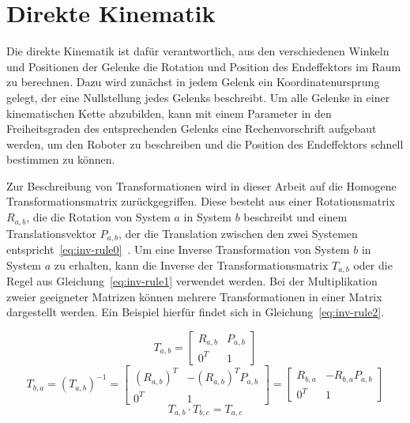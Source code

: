 \cleardoublepage


\chapter{Direkte Kinematik}\label{ch:direkte-kinematik}

Die direkte Kinematik ist dafür verantwortlich, aus den verschiedenen Winkeln und Positionen der Gelenke die Rotation und Position des Endeffektors im Raum zu berechnen.
Dazu wird zunächst in jedem Gelenk ein Koordinatenursprung gelegt, der eine Nullstellung jedes Gelenks beschreibt.
Um alle Gelenke in einer kinematischen Kette abzubilden, kann mit einem Parameter in den Freiheitsgraden des entsprechenden Gelenks eine Rechenvorschrift aufgebaut werden, um den Roboter zu beschreiben und die Position des Endeffektors schnell bestimmen zu können.

Zur Beschreibung von Transformationen wird in dieser Arbeit auf die Homogene Transformationsmatrix zurückgegriffen.
Diese besteht aus einer Rotationsmatrix $R_{a,b}$, die die Rotation von System $a$ in System $b$ beschreibt und einem Translationsvektor $P_{a,b}$, der die Translation zwischen den zwei Systemen entspricht~\ref{eq:inv-rule0}~\cite[28]{craigIntroductionRoboticsMechanics2009}.
Um eine Inverse Transformation von System $b$ in System $a$ zu erhalten, kann die Inverse der Transformationsmatrix $T_{a,b}$ oder die Regel aus Gleichung~\ref{eq:inv-rule1} verwendet werden.
Bei der Multiplikation zweier geeigneter Matrizen können mehrere Transformationen in einer Matrix dargestellt werden.
Ein Beispiel hierfür findet sich in Gleichung~\ref{eq:inv-rule2}.

\begin{equation}
    T_{a,b} = \begin{bmatrix}
                  R_{a,b} & P_{a,b} \\
                  0^T     & 1
    \end{bmatrix} \label{eq:inv-rule0}
\end{equation}
\begin{equation}
    T_{b,a} = \left( T_{a,b} \right)^{-1} =
    \begin{bmatrix}
        \left(R_{a,b}\right)^T & - \left(R_{a,b}\right)^T P_{a,b} \\
        0^T     & 1
    \end{bmatrix} =
    \begin{bmatrix}
        R_{b,a} & - R_{b,a}P_{a,b} \\
        0^T     & 1
    \end{bmatrix}
    \label{eq:inv-rule1}
\end{equation}
\begin{equation}
    T_{a,b}\cdot T_{b,c}=T_{a,c}    \label{eq:inv-rule2}
\end{equation}


